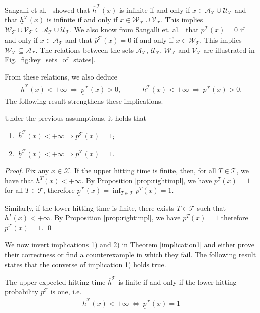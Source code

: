 \documentclass{svproc}
\newcommand{\T}{\mathcal{T}}
\newcommand{\ulp}{\underline{p}}
\newcommand{\olp}{\overline{p}}
\newcommand{\ulh}{\underline{h}}
\newcommand{\olh}{\overline{h}}
\newcommand{\X}{\mathcal{X}}
\newcommand{\U}{\mathscr{U}}
\newcommand{\V}{\mathscr{V}}
\newcommand{\W}{\mathscr{W}}
\newcommand{\A}{\mathscr{A}}
\begin{document}
Sangalli et al.~\cite{sangalli2025meeting} showed that $\olh^\T(x)$ is infinite if and only if $x\in \A_\T \cup \U_\T$ and that $\ulh^\T(x)$ is infinite if and only if $x\in \W_\T \cup \V_\T$. This implies $\W_\T \cup \V_\T \subseteq \A_\T \cup \U_\T$. We also know from Sangalli et. al.~\cite{sangalli2025computing} that $\ulp^\T(x)=0$ if and only if $x\in \A_\T$ and that  $\olp^\T(x)=0$ if and only if $x\in \W_\T$. This implies $\W_\T\subseteq \A_\T$. 
The relations between the sets $\A_\T$, $\U_\T$, $\W_\T$ and $\V_\T$ are illustrated in Fig. \ref{fig:key_sets_of_states}.

From these relations, we also deduce 
\begin{align*}
    \olh^\T(x)<+\infty \ \Rightarrow \ \ulp^\T(x)>0, \quad\qquad 
    \ulh^\T(x)<+\infty \ \Rightarrow \  \olp^\T(x)>0 .
\end{align*}
The following result strengthens these implications.
\begin{theorem}\label{implication1}
    Under the previous assumptions, it holds that
    \begin{enumerate}[label=\arabic*), leftmargin=1cm]
    \item $\ \olh^\T(x)<+\infty \Rightarrow \ulp^\T(x)=1$;
    \item $\ \ulh^\T(x)<+\infty \Rightarrow \olp^\T(x)=1$.
\end{enumerate}
\end{theorem}
\begin{proof}
    Fix any $x\in \X$. If the upper hitting time is finite, then, for all $T\in \T$, we have that $h^T(x)<+\infty$. By Proposition \ref{prop:rightimpl}, we have $p^T(x)=1$ for all $T\in \T$, therefore $\ulp^{\T}(x)=\inf_{T\in \T} p^T(x)=1$.
    
    Similarly, if the lower hitting time is finite, there exists $T\in \T$ such that $h^T(x)<+\infty$. By Proposition \ref{prop:rightimpl}, we have $p^T(x)=1$ therefore $\olp^\T(x)=1$. \qed
\end{proof}
We now invert implications 1) and 2) in Theorem \ref{implication1} and either prove their correctness or find a counterexample in which they fail. The following result states that the converse of implication 1) holds true.
\begin{theorem}
    \label{th:uhtandlhp}
    The upper expected hitting time $\olh^\T$ is finite if and only if the lower hitting probability $\ulp^\T$ is one, i.e.
    \begin{equation}
        \olh^{\T}(x)<+\infty \ \Leftrightarrow \ \ulp^\T(x)=1
    \end{equation}  
\end{theorem}
\end{document}

